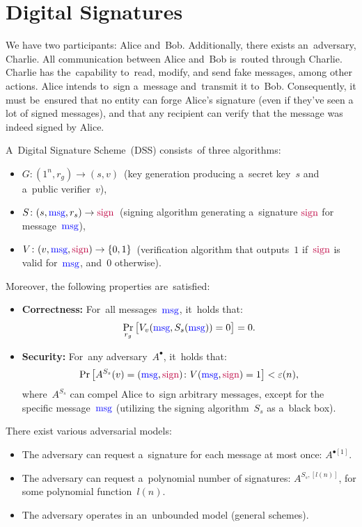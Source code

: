 \section{Digital Signatures}

We have two participants: Alice and~Bob.
Additionally, there exists an~adversary, Charlie.
All communication between Alice and~Bob is~routed through Charlie.
Charlie has the~capability to~read, modify, and send fake messages, among other actions.
Alice intends to~sign a~message and~transmit it to~Bob.
Consequently, it must be~ensured that no entity can forge Alice's signature (even if they've seen a lot of signed messages), and that any recipient can verify that the message was indeed signed by Alice.

\begin{definition}
	A~Digital Signature Scheme~(DSS) consists~of three algorithms:
	\begin{itemize}
		\item $G \colon (1^{n}, r_g) \to (s, v)$~(key generation producing a~secret key~$s$ and a~public verifier~$v$),
		\item $S \colon (s, \textcolor{blue}{\text{msg}}, r_s) \to \textcolor{purple}{\text{sign}}$~(signing algorithm generating a~signature $\textcolor{purple}{\text{sign}}$ for message~$\textcolor{blue}{\text{msg}}$),
		\item $V \colon (v, \textcolor{blue}{\text{msg}}, \textcolor{purple}{\text{sign}}) \to \{0, 1\}$~(verification algorithm that outputs~$1$ if~$\textcolor{purple}{\text{sign}}$ is valid for~$\textcolor{blue}{\text{msg}}$, and~$0$ otherwise).
	\end{itemize}

	Moreover, the following properties are~satisfied:
	\begin{itemize}
		\item \textbf{Correctness:} For~all messages~$\textcolor{blue}{\text{msg}}$, it~holds that:
			\[
				\Pr_{r_g}\big[V_v(\textcolor{blue}{\text{msg}}, S_s(\textcolor{blue}{\text{msg}})) = 0\big] = 0.
			\] 

		\item \textbf{Security:} For~any adversary~$A^\bullet$, it~holds that:
			\[
				\Pr\big[A^{S_s}(v) = (\textcolor{blue}{\text{msg}}, \textcolor{purple}{\text{sign}}) \colon V(\textcolor{blue}{\text{msg}}, \textcolor{purple}{\text{sign}}) = 1\big] < \varepsilon(n),
			\]
			where~$A^{S_s}$ can compel Alice to~sign arbitrary messages, except for the specific message~$\textcolor{blue}{\text{msg}}$ (utilizing the signing algorithm~$S_s$ as a~black box).
	\end{itemize}
\end{definition}

There exist various adversarial models:
\begin{itemize}
	\item The adversary can request a~signature for each message at most once: $A^{\bullet[1]}$.
	\item The adversary can request a~polynomial number of signatures: $A^{S_s, [l(n)]}$, for some polynomial function~$l(n)$.
	\item The adversary operates in an~unbounded model (general schemes).
\end{itemize}

